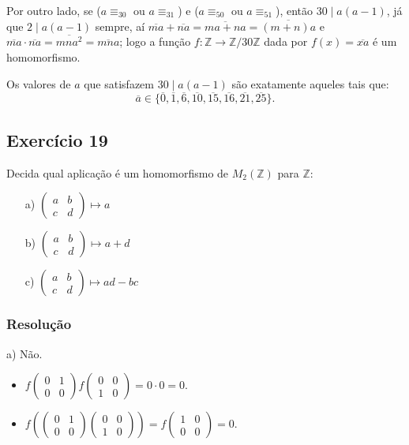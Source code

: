 \documentclass[10pt,a4paper]{article}
\begin{document}
\medskip
\noindent
Por outro lado, se ($a\equiv_30$ ou $a\equiv_31$) e ($a\equiv_50$ ou $a\equiv_51$), então $30\mid a(a-1)$, já que $2\mid a(a-1)$ sempre, aí $\overline{ma}+\overline{na}=\overline{ma+na}=\overline{(m+n)a}$ e $\overline{ma}\cdot\overline{na}=\overline{mna^2}=\overline{mna}$; logo a função $f:\mathbb{Z}\rightarrow\mathbb{Z}/30\mathbb{Z}$ dada por $f(x)=\overline{xa}$ é um homomorfismo.

\medskip
\noindent
Os valores de $a$ que satisfazem $30\mid a(a-1)$ são exatamente aqueles tais que:
\[
\overline{a}\in\{\overline{0},\overline{1},\overline{6},\overline{10},\overline{15},\overline{16},\overline{21},\overline{25}\}.
\]

\subsection*{Exercício 19}
Decida qual aplicação é um homomorfismo de $M_2(\mathbb{Z})$ para $\mathbb{Z}$:
\begin{itemize}
\item[a)] $\begin{pmatrix}
a&b\\c&d
\end{pmatrix}\mapsto a$
\item[b)] $\begin{pmatrix}
a&b\\c&d
\end{pmatrix}\mapsto a+d$
\item[c)] $\begin{pmatrix}
a&b\\c&d
\end{pmatrix}\mapsto ad-bc$
\end{itemize}

\subsubsection*{Resolução}

a) Não.
\begin{itemize}
\item $f\begin{pmatrix}
0&1\\0&0
\end{pmatrix}f\begin{pmatrix}
0&0\\1&0
\end{pmatrix}=0\cdot 0=0$.
\item $f\left(\begin{pmatrix}
0&1\\0&0
\end{pmatrix}\begin{pmatrix}
0&0\\1&0
\end{pmatrix}\right)=f\begin{pmatrix}
1&0\\0&0
\end{pmatrix}=0$.
\end{itemize}
\end{document}
